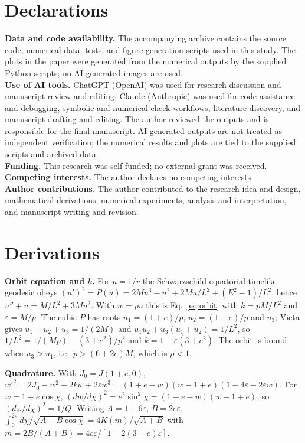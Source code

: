 \documentclass[11pt,a4paper]{article}
\begin{document}
\section*{Declarations}
\textbf{Data and code availability.} The accompanying archive contains the source code, numerical data, tests, and figure-generation scripts used in this study. The plots in the paper were generated from the numerical outputs by the supplied Python scripts; no AI-generated images are used.\\
\textbf{Use of AI tools.} ChatGPT (OpenAI) was used for research discussion and manuscript review and editing. Claude (Anthropic) was used for code assistance and debugging, symbolic and numerical check workflows, literature discovery, and manuscript drafting and editing. The author reviewed the outputs and is responsible for the final manuscript. AI-generated outputs are not treated as independent verification; the numerical results and plots are tied to the supplied scripts and archived data.\\
\textbf{Funding.} This research was self-funded; no external grant was received.\\
\textbf{Competing interests.} The author declares no competing interests.\\
\textbf{Author contributions.} The author contributed to the research idea and design, mathematical derivations, numerical experiments, analysis and interpretation, and manuscript writing and revision.

\appendix
\section{Derivations}
\label{app:deriv}
\textbf{Orbit equation and $k$.} For $u=1/r$ the Schwarzschild equatorial timelike geodesic obeys $(u')^2=P(u)=2Mu^3-u^2+2Mu/L^2+(E^2-1)/L^2$, hence $u''+u=M/L^2+3Mu^2$. With $w=pu$ this is Eq.~\eqref{eq:orbit} with $k=pM/L^2$ and $\varepsilon=M/p$. The cubic $P$ has roots $u_1=(1+e)/p$, $u_2=(1-e)/p$ and $u_3$; Vieta gives $u_1+u_2+u_3=1/(2M)$ and $u_1u_2+u_3(u_1+u_2)=1/L^2$, so $1/L^2=1/(Mp)-(3+e^2)/p^2$ and $k=1-\varepsilon(3+e^2)$. The orbit is bound when $u_3>u_1$, i.e.\ $p>(6+2e)M$, which is $\rho<1$.

\textbf{Quadrature.} With $J_0=J(1+e,0)$, $w'^2=2J_0-w^2+2kw+2\varepsilon w^3=(1+e-w)(w-1+e)(1-4\varepsilon-2\varepsilon w)$. For $w=1+e\cos\chi$, $(dw/d\chi)^2=e^2\sin^2\chi=(1+e-w)(w-1+e)$, so $(d\varphi/d\chi)^2=1/Q$. Writing $A=1-6\varepsilon$, $B=2e\varepsilon$, $\int_0^{2\pi}d\chi/\sqrt{A-B\cos\chi}=4K(m)/\sqrt{A+B}$ with $m=2B/(A+B)=4e\varepsilon/[1-2(3-e)\varepsilon]$.
\end{document}
